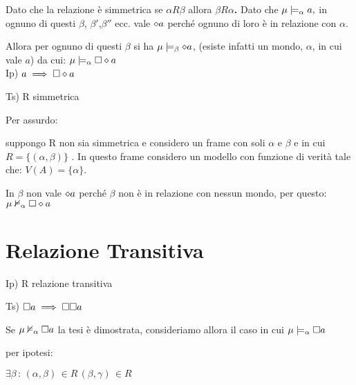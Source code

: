 Dato che la relazione è simmetrica se $\alpha R\beta$ allora \textbf{$\beta R\alpha$.}
Dato che $\mu\models_{\alpha}a,$ in ognuno di questi $\beta$, $\beta'$,$\beta''$
ecc. vale $\diamond a$ perché ognuno di loro è in relazione con $\alpha$.

Allora per ognuno di questi $\beta$ si ha $\mu\models_{\beta}\diamond a$,
(esiste infatti un mondo, $\alpha$, in cui vale $a$) da cui: $\mu\models_{\alpha}\square\diamond a$
\\


Ip) $a\implies\square\diamond a$

Ts) R simmetrica

Per assurdo:

suppongo R non sia simmetrica e considero un frame con soli $\alpha$
e $\beta$ e in cui $R=\{(\alpha,\beta)\}$ . In questo frame considero
un modello con funzione di verità tale che: $V(A)=\{\alpha\}$.

In $\beta$ non vale $\diamond a$ perché $\beta$ non è in relazione con
nessun mondo, per questo: $\mu\nvDash_{\alpha}\square\diamond a$

\begin{center}
\begin{center}   \end{center}
\par\end{center}




\section{Relazione Transitiva}

Ip) R relazione transitiva

Ts) $\square a\implies\square\square a$

Se $\mu\nvDash_{\alpha}\square a$ la tesi è dimostrata, consideriamo
allora il caso in cui $\mu\models_{\alpha}\square a$

per ipotesi:

$\exists\beta\,:\,(\alpha,\beta)\,\in R\,(\beta,\gamma)\,\in R$

